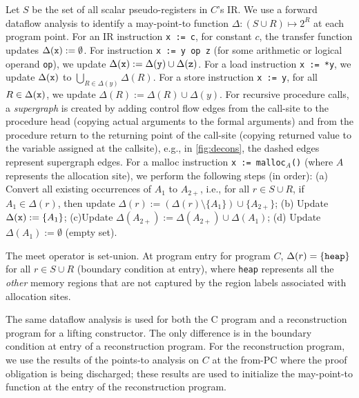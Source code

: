 Let $S$ be the set of all scalar pseudo-registers in $C$'s
IR. We use a forward dataflow
analysis to identify a may-point-to function $\Delta: (S\cup{}R) \mapsto 2^{R}$
at each program point.
For an IR instruction {\tt x := c}, for constant $c$, the
transfer function updates $\Delta({\tt x}) := \emptyset$.
For instruction {\tt x := y op z} (for some arithmetic
or logical operand {\tt op}),
we update $\Delta({\tt x}) := \Delta({\tt y})\cup\Delta({\tt z})$.
For a
load instruction {\tt x := *y}, we
update $\Delta({\tt x})$ to $\bigcup_{R\in\Delta(y)}\Delta(R)$.
For a store instruction {\tt *x := y}, for all
$R\in\Delta({\tt x})$, we update $\Delta(R) := \Delta(R)\cup\Delta(y)$.
For recursive procedure calls, a {\em supergraph}
is created by adding control flow edges
from the call-site to the procedure head (copying actual arguments
to the formal arguments) and from the procedure
return to the returning point of the call-site (copying returned
value to the variable assigned at the callsite), e.g., in
\cref{fig:decons}, the dashed edges
represent supergraph edges.
For a malloc instruction {\tt x := malloc$_A$()} (where $A$
represents the allocation site), we perform the following steps (in order):
(a) Convert all existing occurrences of $A_1$ to $A_{2+}$, i.e., for all $r\in{}S\cup{}R$, if $A_1\in\Delta(r)$, then update $\Delta(r) := (\Delta(r)\setminus\{A_1\})\cup\{A_{2+}\}$;
(b) Update $\Delta({\tt x}) := \{A_1\}$;
(c)Update $\Delta(A_{2+}) := \Delta(A_{2+})\cup\Delta(A_1)$;
(d) Update $\Delta(A_1) := \emptyset$ (empty set).

The meet operator is set-union. At program entry for
program $C$, $\Delta(r)=\{{\tt heap}\}$ for
all $r\in{}S\cup{}R$ (boundary condition at entry), where {\tt heap} represents all the {\em other} memory
regions that are not captured by the region labels associated with allocation
sites.

The same dataflow analysis is used for both the C program and a
reconstruction program for a lifting constructor.
The only difference is in the boundary condition at entry of a
reconstruction program. For the
reconstruction program, we use the results of the points-to
analysis on $C$ at the from-PC where the proof obligation is being
discharged; these results are used
to initialize the may-point-to function at the
entry of the reconstruction program.


